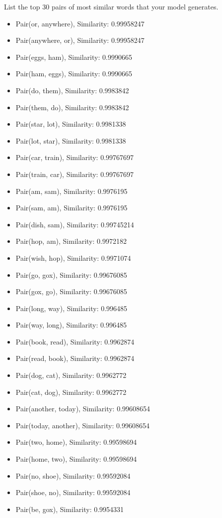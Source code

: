 \problem[1]
List the top 30 pairs of most similar words that your model generates.
\begin{solution}
    \begin{itemize}
        \item Pair(or, anywhere), Similarity: 0.99958247
        \item Pair(anywhere, or), Similarity: 0.99958247
        \item Pair(eggs, ham), Similarity: 0.9990665
        \item Pair(ham, eggs), Similarity: 0.9990665
        \item Pair(do, them), Similarity: 0.9983842
        \item Pair(them, do), Similarity: 0.9983842
        \item Pair(star, lot), Similarity: 0.9981338
        \item Pair(lot, star), Similarity: 0.9981338
        \item Pair(car, train), Similarity: 0.99767697
        \item Pair(train, car), Similarity: 0.99767697
        \item Pair(am, sam), Similarity: 0.9976195
        \item Pair(sam, am), Similarity: 0.9976195
        \item Pair(dish, sam), Similarity: 0.99745214
        \item Pair(hop, am), Similarity: 0.9972182
        \item Pair(wish, hop), Similarity: 0.9971074
        \item Pair(go, gox), Similarity: 0.99676085
        \item Pair(gox, go), Similarity: 0.99676085
        \item Pair(long, way), Similarity: 0.996485
        \item Pair(way, long), Similarity: 0.996485
        \item Pair(book, read), Similarity: 0.9962874
        \item Pair(read, book), Similarity: 0.9962874
        \item Pair(dog, cat), Similarity: 0.9962772
        \item Pair(cat, dog), Similarity: 0.9962772
        \item Pair(another, today), Similarity: 0.99608654
        \item Pair(today, another), Similarity: 0.99608654
        \item Pair(two, home), Similarity: 0.99598694
        \item Pair(home, two), Similarity: 0.99598694
        \item Pair(no, shoe), Similarity: 0.99592084
        \item Pair(shoe, no), Similarity: 0.99592084
        \item Pair(be, gox), Similarity: 0.9954331
    \end{itemize}
    
\end{solution}

